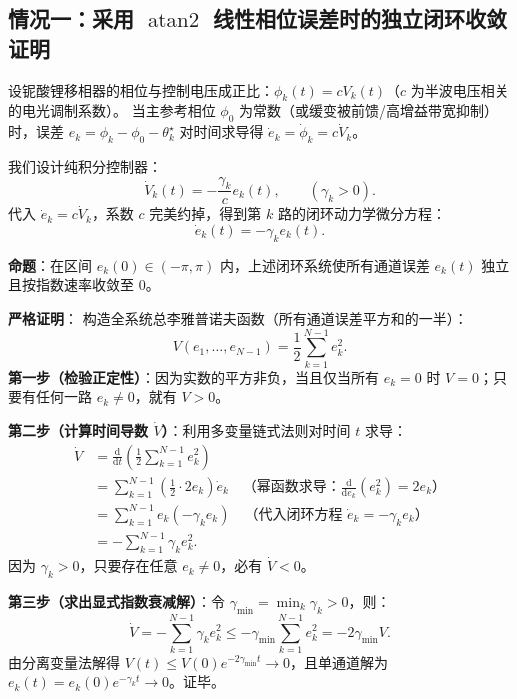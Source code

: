 \documentclass[UTF8, a4paper, 11pt]{ctexart}
\newcommand{\dd}{\mathrm{d}}
\begin{document}
\subsection{情况一：采用 \texorpdfstring{$\operatorname{atan2}$}{atan2} 线性相位误差时的独立闭环收敛证明}

设铌酸锂移相器的相位与控制电压成正比：$\phi_k(t) = c V_k(t)$（$c$ 为半波电压相关的电光调制系数）。
当主参考相位 $\phi_0$ 为常数（或缓变被前馈/高增益带宽抑制）时，误差 $e_k = \phi_k - \phi_0 - \theta_k^\star$ 对时间求导得 $\dot{e}_k = \dot{\phi}_k = c \dot{V}_k$。

我们设计纯积分控制器：
\[
    \dot{V}_k(t) = -\frac{\gamma_k}{c} e_k(t), \qquad (\gamma_k > 0).
\]
代入 $\dot{e}_k = c \dot{V}_k$，系数 $c$ 完美约掉，得到第 $k$ 路的闭环动力学微分方程：
\[
    \dot{e}_k(t) = -\gamma_k e_k(t).
\]

\begin{proofbox}
\textbf{命题}：在区间 $e_k(0) \in (-\pi, \pi)$ 内，上述闭环系统使所有通道误差 $e_k(t)$ 独立且按指数速率收敛至 $0$。

\textbf{严格证明}：
构造全系统总李雅普诺夫函数（所有通道误差平方和的一半）：
\[
    V(e_1, \dots, e_{N-1}) = \frac{1}{2}\sum_{k=1}^{N-1} e_k^2.
\]
\textbf{第一步（检验正定性）}：因为实数的平方非负，当且仅当所有 $e_k = 0$ 时 $V = 0$；只要有任何一路 $e_k \neq 0$，就有 $V > 0$。

\textbf{第二步（计算时间导数 $\dot{V}$）}：利用多变量链式法则对时间 $t$ 求导：
\begin{align*}
    \dot{V} &= \frac{\dd}{\dd t}\left( \frac{1}{2}\sum_{k=1}^{N-1} e_k^2 \right) \\
    &= \sum_{k=1}^{N-1} \left(\frac{1}{2} \cdot 2 e_k\right) \dot{e}_k \quad \text{（幂函数求导：$\frac{\dd}{\dd e_k}(e_k^2) = 2e_k$）}\\
    &= \sum_{k=1}^{N-1} e_k \left(-\gamma_k e_k\right) \quad \text{（代入闭环方程 $\dot{e}_k = -\gamma_k e_k$）}\\
    &= -\sum_{k=1}^{N-1} \gamma_k e_k^2.
\end{align*}
因为 $\gamma_k > 0$，只要存在任意 $e_k \neq 0$，必有 $\dot{V} < 0$。

\textbf{第三步（求出显式指数衰减解）}：令 $\gamma_{\min} = \min_{k} \gamma_k > 0$，则：
\[
    \dot{V} = -\sum_{k=1}^{N-1} \gamma_k e_k^2 \le -\gamma_{\min} \sum_{k=1}^{N-1} e_k^2 = -2\gamma_{\min} V.
\]
由分离变量法解得 $V(t) \le V(0)e^{-2\gamma_{\min} t} \to 0$，且单通道解为 $e_k(t) = e_k(0)e^{-\gamma_k t} \to 0$。证毕。
\end{proofbox}
\end{document}
